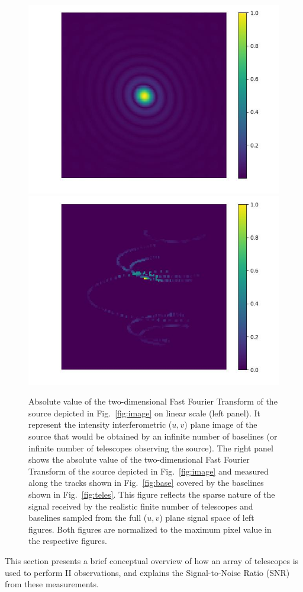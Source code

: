 \begin{figure}
	\includegraphics[width=.49\linewidth]{fig/ft/ft.jpg}\hfil
	\includegraphics[width=.49\linewidth]{fig/ft/ft_base.jpg}
	\caption{Absolute value of the two-dimensional Fast Fourier Transform of the source depicted in Fig.~\ref{fig:image} on linear scale (left panel). It represent the intensity interferometric ($u,v$) plane image of the source that would be obtained by an infinite number of baselines (or infinite number of telescopes observing the source). The right panel shows the absolute value of the two-dimensional Fast Fourier Transform of the source depicted in Fig.~\ref{fig:image} and measured along the tracks shown in Fig.~\ref{fig:base} covered by the baselines shown in Fig.~\ref{fig:teles}. This figure reflects the sparse nature of the signal received by the realistic finite number of telescopes and baselines sampled from the full ($u,v$) plane signal space of left figures. Both figures are normalized to the maximum pixel value in the respective figures.}
	\label{fig:ft}
\end{figure}
This section presents a brief conceptual overview of how an array of telescopes is used to perform II observations, and explains the Signal-to-Noise Ratio (SNR) from these measurements.
